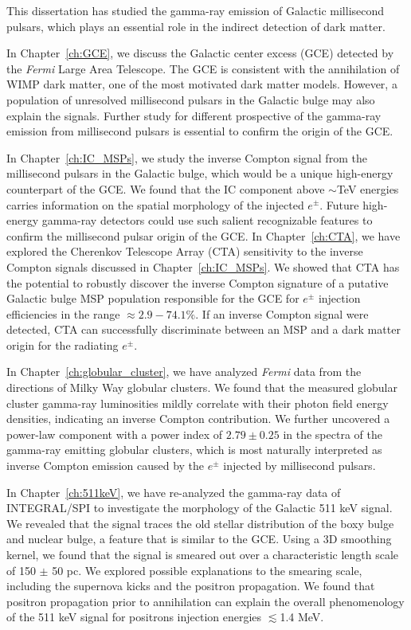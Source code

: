 \documentclass[doublespace,nopageskip]{VTthesis} %
\begin{document}
This dissertation has studied the gamma-ray emission of Galactic millisecond pulsars, which plays an essential role in the indirect detection of dark matter. 

In Chapter~\ref{ch:GCE}, we discuss the Galactic center excess (GCE) detected by the \textit{Fermi} Large Area Telescope. The GCE is consistent with the annihilation of WIMP dark matter, one of the most motivated dark matter models. However, a population of unresolved millisecond pulsars in the Galactic bulge may also explain the signals. Further study for different prospective of the gamma-ray emission from millisecond pulsars is essential to confirm the origin of the GCE.


In Chapter~\ref{ch:IC_MSPs}, we study the inverse Compton signal from the millisecond pulsars in the Galactic bulge, which would be a unique high-energy counterpart of the GCE. We found that the IC component above $\sim$TeV energies carries information on the spatial morphology of the injected $e^\pm$. Future high-energy gamma-ray detectors could use such salient recognizable features to confirm the millisecond pulsar origin of the GCE. In Chapter~\ref{ch:CTA}, we have explored the Cherenkov Telescope Array (CTA) sensitivity to the inverse Compton signals discussed in Chapter~\ref{ch:IC_MSPs}. We showed that CTA has the potential to robustly discover the inverse Compton signature of a putative
Galactic bulge MSP population responsible for the GCE for $e^\pm$ injection efficiencies in the range $\approx 2.9 - 74.1\%$. If an inverse Compton signal were detected, CTA can successfully discriminate between an MSP and a dark matter origin for the radiating $e^\pm$.

In Chapter~\ref{ch:globular_cluster}, we have analyzed \textit{Fermi} data from the directions of Milky Way globular clusters. We found that the measured globular cluster gamma-ray luminosities mildly correlate with their photon field energy densities, indicating an inverse Compton contribution. We further uncovered a power-law component with a power index of $2.79 \pm 0.25$ in the spectra of the gamma-ray emitting globular clusters, which is most naturally interpreted as inverse Compton emission caused by the $e^\pm$ injected by millisecond pulsars.

In Chapter~\ref{ch:511keV}, we have re-analyzed the gamma-ray data of INTEGRAL/SPI to investigate the morphology of the Galactic 511 keV signal. We revealed that the signal traces the old stellar distribution of the boxy bulge and nuclear bulge, a feature that is similar to the GCE. Using a 3D smoothing kernel, we found that the signal is smeared out over a characteristic length scale of 150 $\pm$ 50 pc. We explored possible explanations to the smearing scale, including the supernova kicks and the positron propagation. We found that positron propagation prior to annihilation can explain the overall phenomenology of the 511 keV signal for positrons injection energies $\lesssim$1.4 MeV.
\end{document}
